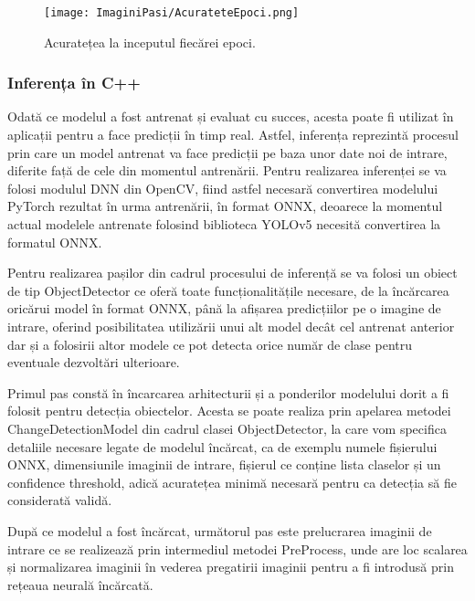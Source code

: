 \documentclass[12pt]{article}
\begin{document}
\begin{figure}[H]
  \centering
  \texttt{[image: ImaginiPasi/AcurateteEpoci.png]}
  \caption{Acuratețea la inceputul fiec\u{a}rei epoci.}
  \label{fig:acuratete_epoci}
\end{figure}

\subsubsection{Inferența \^{i}n C++}

Odat\u{a} ce modelul a fost antrenat și evaluat cu succes, acesta poate fi utilizat \^{i}n aplicații pentru a face predicții \^{i}n timp real. Astfel, inferența reprezint\u{a} procesul prin care un model antrenat va face predicții pe baza unor date noi de intrare, diferite faț\u{a} de cele din momentul antren\u{a}rii. Pentru realizarea inferenței se va folosi modulul DNN din OpenCV, fiind astfel necesar\u{a} convertirea modelului PyTorch rezultat \^{i}n urma antren\u{a}rii, \^{i}n format ONNX, deoarece la momentul actual modelele antrenate folosind biblioteca YOLOv5 necesit\u{a} convertirea la formatul ONNX.

Pentru realizarea pașilor din cadrul procesului de inferenț\u{a} se va folosi un obiect de tip ObjectDetector ce ofer\u{a} toate funcționalit\u{a}țile necesare, de la \^{i}nc\u{a}rcarea oric\u{a}rui model \^{i}n format ONNX, p\^{a}n\u{a} la afișarea predicțiilor pe o imagine de intrare, oferind posibilitatea utiliz\u{a}rii unui alt model dec\^{a}t cel antrenat anterior dar și a folosirii altor modele ce pot detecta orice num\u{a}r de clase pentru eventuale dezvolt\u{a}ri ulterioare. 

Primul pas const\u{a} \^{i}n \^{i}ncarcarea arhitecturii și a ponderilor modelului dorit a fi folosit pentru detecția obiectelor. Acesta se poate realiza prin apelarea metodei ChangeDetectionModel din cadrul clasei ObjectDetector, la care vom specifica detaliile necesare legate de modelul \^{i}nc\u{a}rcat, ca de exemplu numele fișierului ONNX, dimensiunile imaginii de intrare, fișierul ce conține lista claselor și un confidence threshold, adic\u{a} acuratețea minim\u{a} necesar\u{a} pentru ca detecția s\u{a} fie considerat\u{a} valid\u{a}.

Dup\u{a} ce modelul a fost \^{i}nc\u{a}rcat, urm\u{a}torul pas este prelucrarea imaginii de intrare ce se realizeaz\u{a} prin intermediul metodei PreProcess, unde are loc scalarea și normalizarea imaginii \^{i}n vederea pregatirii imaginii pentru a fi introdus\u{a} prin rețeaua neural\u{a} \^{i}nc\u{a}rcat\u{a}.
\end{document}
